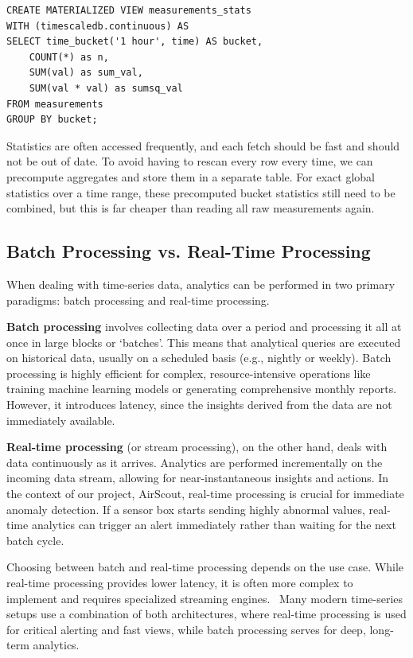 \begin{lstlisting}[language=PGTSSQL, caption=Creating a Continuous Aggregate in TimescaleDB]
CREATE MATERIALIZED VIEW measurements_stats
WITH (timescaledb.continuous) AS
SELECT time_bucket('1 hour', time) AS bucket,
    COUNT(*) as n,
    SUM(val) as sum_val,
    SUM(val * val) as sumsq_val
FROM measurements
GROUP BY bucket;
\end{lstlisting}



Statistics are often accessed frequently, and each fetch should be fast and
should not be out of date. To avoid having to rescan every row every time, we
can precompute aggregates and store them in a separate table. For exact global
statistics over a time range, these precomputed bucket statistics still need to
be combined, but this is far cheaper than reading all raw measurements again.

\subsection{Batch Processing vs. Real-Time Processing}

When dealing with time-series data, analytics can be performed in two primary
paradigms: batch processing and real-time processing.

\textbf{Batch processing} involves collecting data over a period and processing it all at once in large blocks or `batches'. This means that analytical queries are executed on historical data, usually on a scheduled basis (e.g., nightly or weekly). Batch processing is highly efficient for complex, resource-intensive operations like training machine learning models or generating comprehensive monthly reports. However, it introduces latency, since the insights derived from the data are not immediately available.

\textbf{Real-time processing} (or stream processing), on the other hand, deals with data continuously as it arrives. Analytics are performed incrementally on the incoming data stream, allowing for near-instantaneous insights and actions. In the context of our project, AirScout, real-time processing is crucial for immediate anomaly detection. If a sensor box starts sending highly abnormal values, real-time analytics can trigger an alert immediately rather than waiting for the next batch cycle.

Choosing between batch and real-time processing depends on the use case. While
real-time processing provides lower latency, it is often more complex to
implement and requires specialized streaming engines.~\cite{BatchVsRealTime:01}
Many modern time-series setups use a combination of both architectures, where
real-time processing is used for critical alerting and fast views, while batch
processing serves for deep, long-term analytics.
